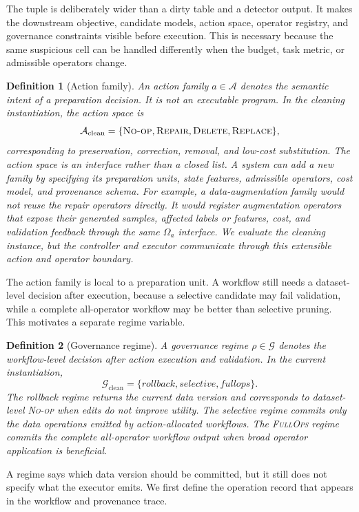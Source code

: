 \documentclass[sigconf, nonacm]{acmart}
\newcommand{\noop}{\textsc{No-op}\xspace}
\newcommand{\repair}{\textsc{Repair}\xspace}
\newcommand{\deleteop}{\textsc{Delete}\xspace}
\newcommand{\replaceop}{\textsc{Replace}\xspace}
\newcommand{\fullops}{\textsc{FullOps}\xspace}
\newtheorem{definition}{Definition}
\begin{document}
The tuple is deliberately wider than a dirty table and a detector output. It makes the downstream objective, candidate models, action space, operator registry, and governance constraints visible before execution. This is necessary because the same suspicious cell can be handled differently when the budget, task metric, or admissible operators change.

\begin{definition}[Action family]
An action family $a\in\mathcal{A}$ denotes the semantic intent of a preparation decision. It is not an executable program. In the cleaning instantiation, the action space is
\[
  \mathcal{A}_{\mathrm{clean}}=\{\noop,\repair,\deleteop,\replaceop\},
\]
corresponding to preservation, correction, removal, and low-cost substitution.
The action space is an interface rather than a closed list. A system can add a new family by specifying its preparation units, state features, admissible operators, cost model, and provenance schema. For example, a data-augmentation family would not reuse the repair operators directly. It would register augmentation operators that expose their generated samples, affected labels or features, cost, and validation feedback through the same $\Omega_a$ interface. We evaluate the cleaning instance, but the controller and executor communicate through this extensible action and operator boundary.
\end{definition}

The action family is local to a preparation unit. A workflow still needs a dataset-level decision after execution, because a selective candidate may fail validation, while a complete all-operator workflow may be better than selective pruning. This motivates a separate regime variable.

\begin{definition}[Governance regime]
A governance regime $\rho\in\mathcal{G}$ denotes the workflow-level decision after action execution and validation. In the current instantiation,
\[
  \mathcal{G}_{\mathrm{clean}}=\{\mathit{rollback},\mathit{selective},\mathit{fullops}\}.
\]
The rollback regime returns the current data version and corresponds to dataset-level \noop when edits do not improve utility. The selective regime commits only the data operations emitted by action-allocated workflows. The \fullops regime commits the complete all-operator workflow output when broad operator application is beneficial.
\end{definition}

A regime says which data version should be committed, but it still does not specify what the executor emits. We first define the operation record that appears in the workflow and provenance trace.
\end{document}
